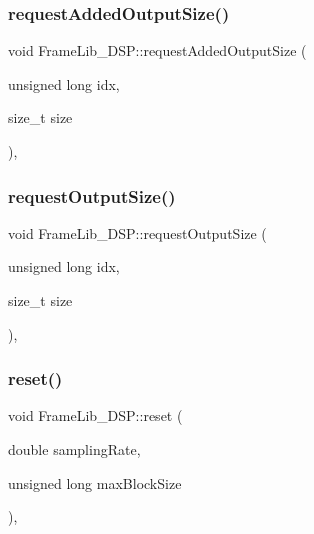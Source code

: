 \subsubsection{\texorpdfstring{request\+Added\+Output\+Size()}{requestAddedOutputSize()}}
{\footnotesize\ttfamily void Frame\+Lib\+\_\+\+D\+S\+P\+::request\+Added\+Output\+Size (\begin{DoxyParamCaption}\item[{unsigned long}]{idx,  }\item[{size\+\_\+t}]{size }\end{DoxyParamCaption})\hspace{0.3cm}{\ttfamily [inline]}, {\ttfamily [protected]}}

\mbox{\label{class_frame_lib___d_s_p_a018be5346f473c3c21d5251d6acb85c7}} 
\subsubsection{\texorpdfstring{request\+Output\+Size()}{requestOutputSize()}}
{\footnotesize\ttfamily void Frame\+Lib\+\_\+\+D\+S\+P\+::request\+Output\+Size (\begin{DoxyParamCaption}\item[{unsigned long}]{idx,  }\item[{size\+\_\+t}]{size }\end{DoxyParamCaption})\hspace{0.3cm}{\ttfamily [inline]}, {\ttfamily [protected]}}

\mbox{\label{class_frame_lib___d_s_p_a0b0edaaaa82b80f3800918283a6a46f0}} 
\subsubsection{\texorpdfstring{reset()}{reset()}}
{\footnotesize\ttfamily void Frame\+Lib\+\_\+\+D\+S\+P\+::reset (\begin{DoxyParamCaption}\item[{double}]{sampling\+Rate,  }\item[{unsigned long}]{max\+Block\+Size }\end{DoxyParamCaption})\hspace{0.3cm}{\ttfamily [final]}, {\ttfamily [virtual]}}



